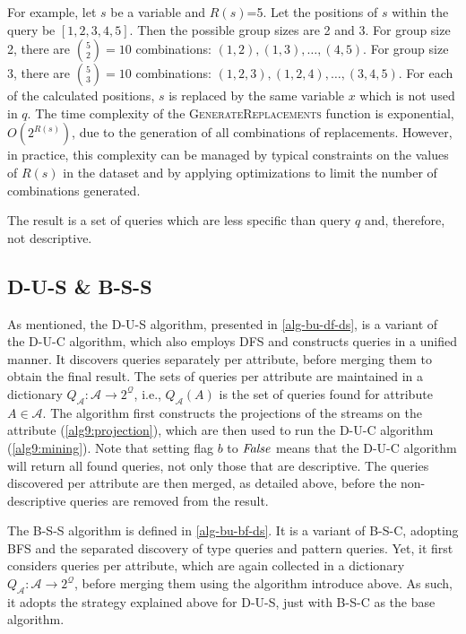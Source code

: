 For example, let $s$ be a variable and $R(s)$=5. Let the positions of $s$
within the query be $[1,2,3,4,5]$.
Then the possible group sizes are 2 and 3.
For group size 2, there are $\binom{5}{2}=10$ combinations: $
(1,2),(1,3),\dots, (4,5)$.
For group size 3, there are $\binom{5}{3}=10$ combinations: $
(1,2,3),(1,2,4),\dots, (3,4,5)$.
For each of the calculated positions, $s$ is replaced by the same variable $x$ which is not
used in $q$.
The time complexity of the \textsc{GenerateReplacements} function is exponential,
$O(2^{R(s)})$, due to the generation of all combinations of replacements.
However, in practice, this complexity can be managed by typical constraints on
the values of $R(s)$ in the dataset and by applying optimizations to limit
the number of combinations generated.

The result is a set of
queries which are less specific than query $q$ and, therefore, not
descriptive.



\subsection{D-U-S \& B-S-S}
\label{sec:alg_further}

As mentioned, the D-U-S algorithm, presented in \autoref{alg-bu-df-ds}, is a
variant of the D-U-C algorithm, which also
employs DFS and constructs queries in a unified manner.
It discovers queries separately per attribute, before merging
them to obtain the
final result. The sets of queries per attribute are maintained in a
dictionary $Q_{\mathcal{A}}: \mathcal{A} \rightarrow 2^{\mathcal{Q}}$, i.e.,
$Q_{\mathcal{A}}(A)$ is the set of queries found for attribute $A\in
\mathcal{A}$. The algorithm first constructs the projections of the streams
on the attribute (\autoref{alg9:projection}), which are then used to run the
D-U-C algorithm (\autoref{alg9:mining}). Note that setting flag $b$ to
$\mathit{False}$ means that the D-U-C algorithm will return all found queries, not
only those that are descriptive. The queries discovered per attribute are
then merged, as detailed above, before the non-descriptive queries are
removed from the result.


The B-S-S algorithm is defined in \autoref{alg-bu-bf-ds}. It is a variant of
B-S-C, adopting BFS and the separated
discovery of type queries and pattern queries. Yet, it first considers
queries per attribute, which are again collected in a
dictionary $Q_{\mathcal{A}}: \mathcal{A} \rightarrow 2^{\mathcal{Q}}$,
before merging them using the algorithm introduce above. As such, it
adopts the strategy explained above for D-U-S, just with B-S-C as the base
algorithm.



